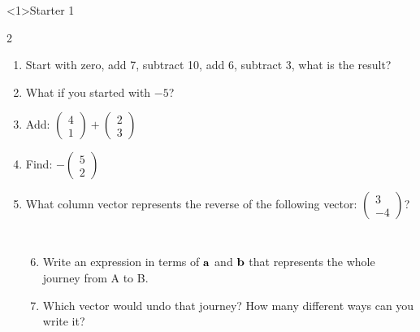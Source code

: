 \documentclass{beamer}
\newcommand{\ashow}[1]{\uncover<2->{\textcolor{red}{\small #1}}}
\begin{document}
\begin{frame}<1>{Starter 1}

\begin{multicols}{2}
\begin{enumerate}
  \item Start with zero, add 7, subtract 10, add 6, subtract 3, what is the result? \ashow{0}
  \item What if you started with $-5$? \ashow{$-5$}
  \item Add:
  $\begin{pmatrix}4\\1\end{pmatrix}
  +
  \begin{pmatrix}2\\3\end{pmatrix}$ \ashow{\(\binom{6}{4}\)}
  \item Find:
  $-\begin{pmatrix}5\\2\end{pmatrix}$ \ashow{\(\binom{-5}{-2}\)}
  \item What column vector represents the reverse of the following vector:
  $\begin{pmatrix}3\\-4\end{pmatrix}$? \ashow{\(\binom{-3}{4}\)}
\end{enumerate}
\end{multicols}

\vspace{0.3cm}



\begin{columns}[T]

\begin{center}
\end{center}


\begin{enumerate}
    \setcounter{enumi}{5}
  \item Write an expression in terms of $\bf{a}$ and $\bf{b}$ that represents the whole journey from A to B. \ashow{\(\mathbf{a}+\mathbf{b}\)}
  \item Which vector would undo that journey? How many different ways can you write it? \ashow{\(\overrightarrow{BA} = -(\mathbf{a}+\mathbf{b}) = -\mathbf{a}-\mathbf{b}\)}
\end{enumerate}

\end{columns}

\end{frame}
\end{document}
